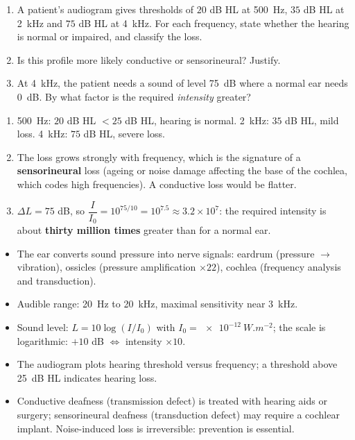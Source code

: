 \documentclass[11pt]{article}
\begin{document}
\begin{exercice}
\begin{enumerate}
\item A patient's audiogram gives thresholds of $20$ dB HL at \SI{500}{Hz}, $35$ dB HL at \SI{2}{kHz} and $75$ dB HL at \SI{4}{kHz}. For each frequency, state whether the hearing is normal or impaired, and classify the loss.
\item Is this profile more likely conductive or sensorineural? Justify.
\item At \SI{4}{kHz}, the patient needs a sound of level \SI{75}{dB} where a normal ear needs \SI{0}{dB}. By what factor is the required \emph{intensity} greater?
\end{enumerate}
\end{exercice}

\begin{corrige}[Exercise 1]
\begin{enumerate}
\item \SI{500}{Hz}: $20$ dB HL $< 25$ dB HL, hearing is normal. \SI{2}{kHz}: $35$ dB HL, mild loss. \SI{4}{kHz}: $75$ dB HL, severe loss.
\item The loss grows strongly with frequency, which is the signature of a \textbf{sensorineural} loss (ageing or noise damage affecting the base of the cochlea, which codes high frequencies). A conductive loss would be flatter.
\item $\Delta L = 75$ dB, so $\dfrac{I}{I_0} = 10^{75/10} = 10^{7.5} \approx 3.2 \times 10^{7}$: the required intensity is about \textbf{thirty million times} greater than for a normal ear.
\end{enumerate}
\end{corrige}

\begin{aretenir}
\begin{itemize}
\item The ear converts sound pressure into nerve signals: eardrum (pressure $\to$ vibration), ossicles (pressure amplification $\times 22$), cochlea (frequency analysis and transduction).
\item Audible range: \SI{20}{Hz} to \SI{20}{kHz}, maximal sensitivity near \SI{3}{kHz}.
\item Sound level: $L = 10\log(I/I_0)$ with $I_0 = \SI{e-12}{W.m^{-2}}$; the scale is logarithmic: $+10$ dB $\Leftrightarrow$ intensity $\times 10$.
\item The audiogram plots hearing threshold versus frequency; a threshold above \SI{25}{dB} HL indicates hearing loss.
\item Conductive deafness (transmission defect) is treated with hearing aids or surgery; sensorineural deafness (transduction defect) may require a cochlear implant. Noise-induced loss is irreversible: prevention is essential.
\end{itemize}
\end{aretenir}
\end{document}
